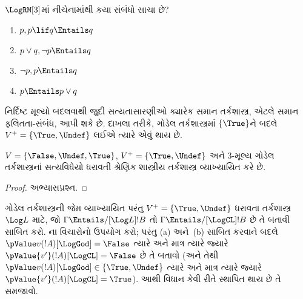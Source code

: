 \begin{prob}
  $\LogRM[3]$માં નીચેનામાંથી કયા સંબંધો સાચા છે?
  \begin{enumerate}
    \item $p, p \lif q \Entails q$
    \item $p \lor q, \lnot p \Entails q$
    \item $\lnot p, p \Entails q$
    \item $p \Entails p \lor q$
  \end{enumerate}
\end{prob}

નિર્દિષ્ટ મૂલ્યો બદલવાથી જુદી સત્યતાસારણીઓ ક્યારેક સમાન
તર્કશાસ્ત્ર, એટલે સમાન ફલિતતા-સંબંધ, આપી શકે છે. દાખલા તરીકે,
ગોડેલ તર્કશાસ્ત્રમાં $\{\True\}$ને બદલે
$V^+ = \{\True, \Undef\}$ લઈએ ત્યારે એવું થાય છે.

\begin{prop}
  $V = \{\False, \Undef,\True\}$, $V^+=\{\True,
  \Undef\}$ અને $3$-મૂલ્ય ગોડેલ તર્કશાસ્ત્રનાં સત્યવિધેયો ધરાવતી
  શ્રેણિક શાસ્ત્રીય તર્કશાસ્ત્ર વ્યાખ્યાયિત કરે છે.
\end{prop}

\begin{proof}
  અભ્યાસપ્રશ્ન.
\end{proof}

\begin{prob}
  ગોડેલ તર્કશાસ્ત્રની જેમ વ્યાખ્યાયિત પરંતુ
  $V^+=\{\True,\Undef\}$ ધરાવતા તર્કશાસ્ત્ર~$\Log L$ માટે,
  જો $\Gamma \Entails/[\Log L] !B$ તો
  $\Gamma \Entails/[\LogCL] !B$ છે તે બતાવી
   સાબિત કરો.
  ના વિચારોનો ઉપયોગ કરો;
  પરંતુ (a) અને~(b) સાબિત કરવાને બદલે
  $\pValue v(!A)[\LogGod] = \False$ ત્યારે અને માત્ર ત્યારે જ્યારે
  $\pValue {v'}(!A)[\LogCL] = \False$ છે તે બતાવો
  (અને તેથી $\pValue v(!A)[\LogGod] \in \{\True,\Undef\}$ ત્યારે
  અને માત્ર ત્યારે જ્યારે $\pValue {v'}(!A)[\LogCL] = \True$).
  આથી વિધાન કેવી રીતે સ્થાપિત થાય છે તે સમજાવો.
\end{prob}
\endgroup


\OLEndChapterHook
\endgroup


\begingroup
\makeatletter{}\makeatother

\label{guunit:OLP-0398}


\begingroup
\makeatletter{}\makeatother

